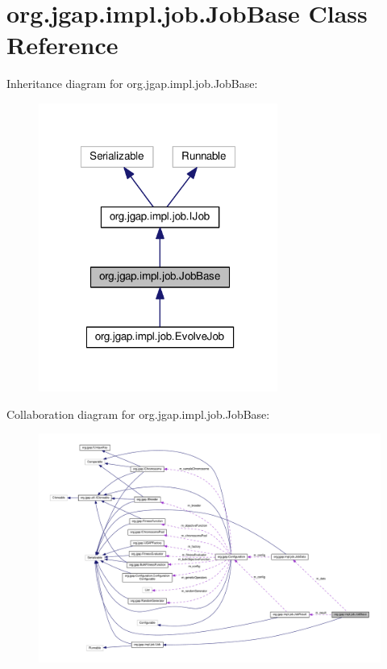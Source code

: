 \hypertarget{classorg_1_1jgap_1_1impl_1_1job_1_1_job_base}{\section{org.\-jgap.\-impl.\-job.\-Job\-Base Class Reference}
\label{classorg_1_1jgap_1_1impl_1_1job_1_1_job_base}
}


Inheritance diagram for org.\-jgap.\-impl.\-job.\-Job\-Base\-:
\nopagebreak
\begin{figure}[H]
\begin{center}
\leavevmode
\includegraphics[width=222pt]{classorg_1_1jgap_1_1impl_1_1job_1_1_job_base__inherit__graph}
\end{center}
\end{figure}


Collaboration diagram for org.\-jgap.\-impl.\-job.\-Job\-Base\-:
\nopagebreak
\begin{figure}[H]
\begin{center}
\leavevmode
\includegraphics[width=350pt]{classorg_1_1jgap_1_1impl_1_1job_1_1_job_base__coll__graph}
\end{center}
\end{figure}
